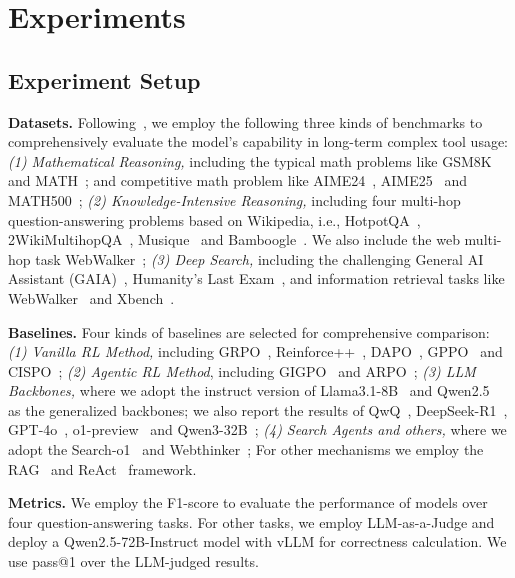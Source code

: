 \documentclass{llmxive}
\begin{document}
\section{Experiments}
\subsection{Experiment Setup}
\noindent\textbf{Datasets.} Following~\cite{dong2025agentic1,dong2025agentic}, we employ  the following three kinds of benchmarks to comprehensively evaluate the model's capability in long-term complex tool usage: \textit{(1) Mathematical Reasoning,} including the typical math problems like GSM8K~\cite{cobbe2021training} and MATH~\cite{hendrycks2021measuring}; and competitive math problem like AIME24~\cite{aime24}, AIME25~\cite{aime25} and MATH500~\cite{lightman2023let}; \textit{(2) Knowledge-Intensive Reasoning,} including four multi-hop question-answering problems based on Wikipedia, i.e., HotpotQA~\cite{yang2018hotpotqa}, 2WikiMultihopQA~\cite{ho2020constructing}, Musique~\cite{trivedi2022musique} and Bamboogle~\cite{press2023measuring}. We also include the web multi-hop task WebWalker~\cite{wu2025webwalker}; \textit{(3) Deep Search,} including the challenging General AI Assistant (GAIA)~\cite{mialon2023gaia}, Humanity's Last Exam~\cite{phan2025humanity}, and information retrieval tasks like WebWalker~\cite{wu2025webwalker} and Xbench~\cite{chen2025xbench}.


\noindent\textbf{Baselines.} Four kinds of baselines are selected for comprehensive comparison: \textit{(1) Vanilla RL Method,} including GRPO~\cite{guo2025deepseek}, Reinforce++~\cite{hu2025reinforce++}, DAPO~\cite{yu2025dapo}, GPPO~\cite{su2025klear} and CISPO~\cite{chen2025minimax}; \textit{(2) Agentic RL Method}, including GIGPO~\cite{feng2025group} and ARPO~\cite{dong2025agentic}; \textit{(3) LLM Backbones,} where we adopt the instruct version of Llama3.1-8B~\cite{dubey2024llama} and Qwen2.5~\cite{hui2024qwen2} as the generalized backbones; we also report the results of QwQ~\cite{team2024qwq}, DeepSeek-R1~\cite{guo2025deepseek}, GPT-4o~\cite{hurst2024gpt}, o1-preview~\cite{hurst2024gpt} and Qwen3-32B~\cite{yang2025qwen3}; \textit{(4) Search Agents and others,} where we adopt the Search-o1~\cite{li2025search} and Webthinker~\cite{li2025webthinker}; For other mechanisms we employ the RAG~\cite{lewis2020retrieval} and ReAct~\cite{yao2022react} framework.

 

\noindent\textbf{Metrics.} We employ the F1-score to evaluate the performance of models over four question-answering tasks. For other tasks, we employ  LLM-as-a-Judge and deploy a Qwen2.5-72B-Instruct model with vLLM for correctness calculation. We use pass@1 over the LLM-judged results.   
\end{document}
